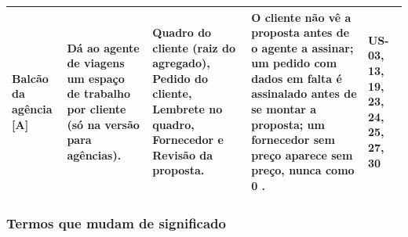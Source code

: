 \begin{longtable}{@{}p{2.4cm}p{3.2cm}p{2.7cm}p{4.0cm}p{1.9cm}@{}}
\textbf{Balcão da agência {[A]}} & Dá ao agente de viagens um espaço de trabalho por cliente (só na versão para agências). & Quadro do cliente (raiz do agregado), Pedido do cliente, Lembrete no quadro, Fornecedor e Revisão da proposta. & O cliente não vê a proposta antes de o agente a assinar; um pedido com dados em falta é assinalado antes de se montar a proposta; um fornecedor sem preço aparece \guillemotleft{}sem preço\guillemotright{}, nunca como 0 \texteuro{}. & US-03, 13, 19, 23, 24, 25, 27, 30 \\ \bottomrule
\end{longtable}

\subsubsection{Termos que mudam de significado}
